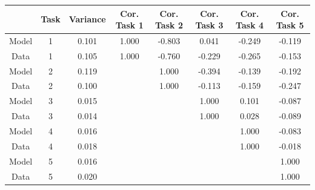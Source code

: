 
\centering
\begin{tabular}[t]{cccccccc}
\toprule
 & Task & Variance & Cor. Task 1 & Cor. Task 2 & Cor. Task 3 & Cor. Task 4 & Cor. Task 5\\
\midrule
Model & 1 & 0.101 & 1.000 & -0.803 & 0.041 & -0.249 & -0.119\\
Data & 1 & 0.105 & 1.000 & -0.760 & -0.229 & -0.265 & -0.153\\
Model & 2 & 0.119 &  & 1.000 & -0.394 & -0.139 & -0.192\\
Data & 2 & 0.100 &  & 1.000 & -0.113 & -0.159 & -0.247\\
Model & 3 & 0.015 &  &  & 1.000 & 0.101 & -0.087\\
Data & 3 & 0.014 &  &  & 1.000 & 0.028 & -0.089\\
Model & 4 & 0.016 &  &  &  & 1.000 & -0.083\\
Data & 4 & 0.018 &  &  &  & 1.000 & -0.018\\
Model & 5 & 0.016 &  &  &  &  & 1.000\\
Data & 5 & 0.020 &  &  &  &  & 1.000\\
\bottomrule
\end{tabular}